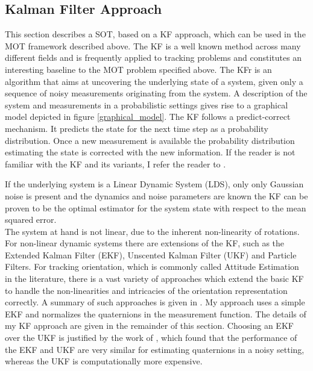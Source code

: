 \documentclass{article}
\begin{document}
\subsection{Kalman Filter Approach}
\label{kf_appraoch}
This section describes a SOT, based on a KF approach, which can be used in the MOT framework described above. The KF is a well known method across many different fields and is frequently applied to tracking problems and constitutes an interesting baseline to the MOT problem specified above. The KFr is an algorithm that aims at uncovering the underlying state of a system, given only a sequence of noisy measurements originating from the system. A description of the system and measurements in a probabilistic settings gives rise to a graphical model depicted in figure \ref{graphical_model}. The KF follows a predict-correct mechanism. It predicts the state for the next time step as a probability distribution. Once a new measurement is available the probability distribution estimating the state is corrected with the new information. If the reader is not familiar with the KF and its variants, I refer the reader to \cite[Chapter~19]{prince}.

If the underlying system is a Linear Dynamic System (LDS), only only Gaussian noise is present and the dynamics and noise parameters are known the KF can be proven to be the optimal estimator for the system state with respect to the mean squared error. \\
The system at hand is not linear, due to the inherent non-linearity of rotations. For non-linear dynamic systems there are extensions of the KF, such as the Extended Kalman Filter (EKF), Unscented Kalman Filter (UKF) and Particle Filters. For tracking orientation, which is commonly called Attitude Estimation in the literature, there is a vast variety of approaches which extend the basic KF to handle the non-linearities and intricacies of the orientation representation correctly. A summary of such approaches is given in \cite{attitude_estimation}. My approach uses a simple EKF and normalizes the quaternions in the measurement function. The details of my KF approach are given in the remainder of this section. Choosing an EKF over the UKF is justified by the work of \cite{EKFvsUKF}, which found that the performance of the EKF and UKF are very similar for estimating quaternions in a noisy setting, whereas the UKF is computationally more expensive.
\end{document}
